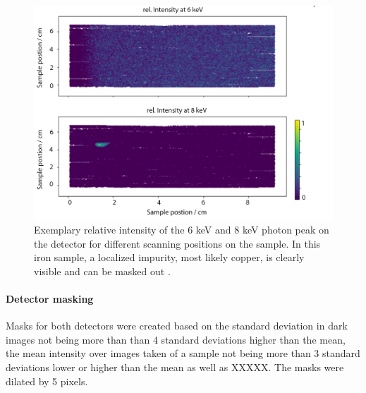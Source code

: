 \begin{figure}
	\centering
	\includegraphics[width=0.7\linewidth]{images/xrf.png}
	\caption[Exemplary relative intensity of the 6 keV and 8 keV photon peak on the detector for different scanning positions on the sample]{Exemplary relative intensity of the 6 keV and 8 keV photon peak on the detector for different scanning positions on the sample. In this iron sample, a localized impurity, most likely copper, is clearly visible and can be masked out .}
	\label{fig:xrf}
\end{figure}

\paragraph{Detector masking}
Masks for both detectors were created based on the standard deviation in dark images not being more than than 4 standard deviations higher than the mean, the mean intensity over images taken of a sample not being more than 3 standard deviations lower or higher than the mean as well as XXXXX.
The masks were dilated by 5 pixels.

